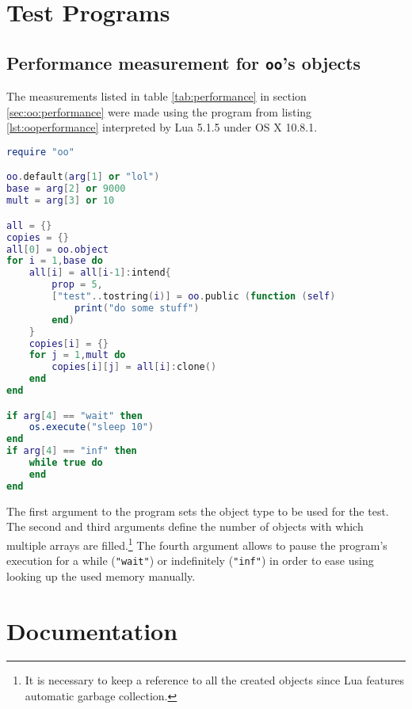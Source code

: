\begin{appendices}

	\chapter{Test Programs}
	
	\section{Performance measurement for \texttt{oo}'s objects}
	\label{sec:app:ooperformance}
	
	The measurements listed in table \ref{tab:performance} in section \ref{sec:oo:performance} were made using the program from listing \ref{lst:ooperformance} interpreted by Lua 5.1.5 under OS X 10.8.1. 
	
\begin{lstlisting}[language=lua, caption={Test program for memory measurement of different object types}, label=lst:ooperformance, name=lst:ooperformance]
require "oo"

oo.default(arg[1] or "lol")
base = arg[2] or 9000
mult = arg[3] or 10

all = {}
copies = {}
all[0] = oo.object
for i = 1,base do
	all[i] = all[i-1]:intend{
		prop = 5,
		["test"..tostring(i)] = oo.public (function (self)
			print("do some stuff")
		end)
	}
	copies[i] = {}
	for j = 1,mult do
		copies[i][j] = all[i]:clone()
	end
end

if arg[4] == "wait" then
	os.execute("sleep 10")
end
if arg[4] == "inf" then
	while true do
	end
end
\end{lstlisting}
	
	The first argument to the program sets the object type to be used for the test. The second and third arguments define the number of objects with which multiple arrays are filled.\footnote{It is necessary to keep a reference to all the created objects since Lua features automatic garbage collection.} The fourth argument allows to pause the program's execution for a while (\texttt{"wait"}) or indefinitely (\texttt{"inf"}) in order to ease using looking up the used memory manually.
	
	
	\chapter{Documentation}

\end{appendices}